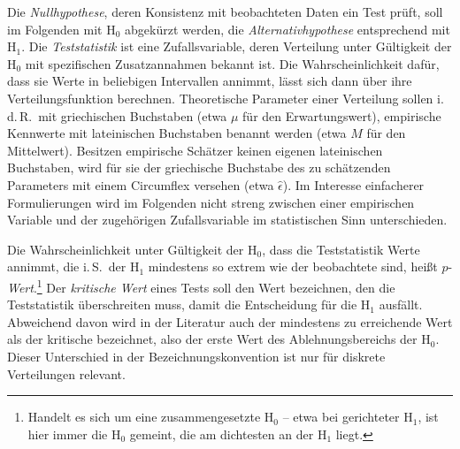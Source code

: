 Die \emph{Nullhypothese}, deren Konsistenz mit beobachteten Daten ein Test prüft, soll im Folgenden mit $\text{H}_{0}$ abgekürzt werden, die \emph{Alternativhypothese} entsprechend mit $\text{H}_{1}$. Die \emph{Teststatistik} ist eine Zufallsvariable, deren Verteilung unter Gültigkeit der $\text{H}_{0}$ mit spezifischen Zusatzannahmen bekannt ist. Die Wahrscheinlichkeit dafür, dass sie Werte in beliebigen Intervallen annimmt, lässt sich dann über ihre Verteilungsfunktion berechnen. Theoretische Parameter einer Verteilung sollen i.\,d.\,R.\ mit griechischen Buchstaben (etwa $\mu$ für den Erwartungswert), empirische Kennwerte mit lateinischen Buchstaben benannt werden (etwa $M$ für den Mittelwert). Besitzen empirische Schätzer keinen eigenen lateinischen Buchstaben, wird für sie der griechische Buchstabe des zu schätzenden Parameters mit einem Circumflex versehen (etwa $\hat{\epsilon}$). Im Interesse einfacherer Formulierungen wird im Folgenden nicht streng zwischen einer empirischen Variable und der zugehörigen Zufallsvariable im statistischen Sinn unterschieden.

Die Wahrscheinlichkeit unter Gültigkeit der $\text{H}_{0}$, dass die Teststatistik Werte annimmt, die i.\,S.\ der $\text{H}_{1}$ mindestens so extrem wie der beobachtete sind, heißt $p$-\emph{Wert}.\footnote{Handelt es sich um eine zusammengesetzte $\text{H}_{0}$ -- etwa bei gerichteter $\text{H}_{1}$, ist hier immer die $\text{H}_{0}$ gemeint, die am dichtesten an der $\text{H}_{1}$ liegt.} Der \emph{kritische Wert} eines Tests soll den Wert bezeichnen, den die Teststatistik überschreiten muss, damit die Entscheidung für die $\text{H}_{1}$ ausfällt. Abweichend davon wird in der Literatur auch der mindestens zu erreichende Wert als der kritische bezeichnet, also der erste Wert des Ablehnungsbereichs der $\text{H}_{0}$. Dieser Unterschied in der Bezeichnungskonvention ist nur für diskrete Verteilungen relevant.

